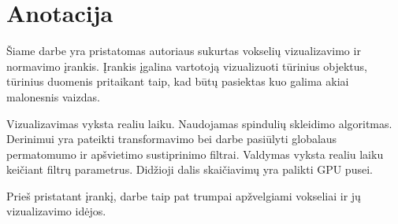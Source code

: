 \section{Anotacija}

Šiame darbe yra pristatomas autoriaus sukurtas vokselių vizualizavimo ir
normavimo įrankis. Įrankis įgalina vartotoją vizualizuoti tūrinius objektus,
tūrinius duomenis pritaikant taip, kad būtų pasiektas kuo galima akiai
malonesnis vaizdas.

Vizualizavimas vyksta realiu laiku. Naudojamas spindulių skleidimo algoritmas.
Derinimui yra pateikti transformavimo bei darbe pasiūlyti globalaus
permatomumo ir apšvietimo sustiprinimo filtrai. Valdymas vyksta realiu laiku
keičiant filtrų parametrus. Didžioji dalis skaičiavimų yra palikti GPU pusei.

Prieš pristatant įrankį, darbe taip pat trumpai apžvelgiami vokseliai ir jų
vizualizavimo idėjos.

